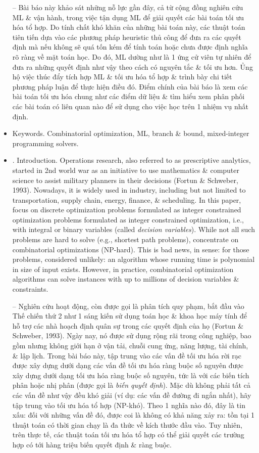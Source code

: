 \documentclass{article}
\begin{document}
\begin{itemize}
    -- Bài báo này khảo sát những nỗ lực gần đây, cả từ cộng đồng nghiên cứu ML \& vận hành, trong việc tận dụng ML để giải quyết các bài toán tối ưu hóa tổ hợp. Do tính chất khó khăn của những bài toán này, các thuật toán tiên tiến dựa vào các phương pháp heuristic thủ công để đưa ra các quyết định mà nếu không sẽ quá tốn kém để tính toán hoặc chưa được định nghĩa rõ ràng về mặt toán học. Do đó, ML dường như là 1 ứng cử viên tự nhiên để đưa ra những quyết định như vậy theo cách có nguyên tắc \& tối ưu hơn. Ủng hộ việc thúc đẩy tích hợp ML \& tối ưu hóa tổ hợp \& trình bày chi tiết phương pháp luận để thực hiện điều đó. Điểm chính của bài báo là xem các bài toán tối ưu hóa chung như các điểm dữ liệu \& tìm hiểu xem phân phối các bài toán có liên quan nào để sử dụng cho việc học trên 1 nhiệm vụ nhất định.
    \item {\sf Keywords.} Combinatorial optimization, ML, branch \& bound, mixed-integer programming solvers.
    \item {. Introduction.} Operations research, also referred to as prescriptive analytics, started in 2nd world war as an initiative to use mathematics \& computer science to assist military planners in their decisions (Fortun \& Schweber, 1993). Nowadays, it is widely used in industry, including but not limited to transportation, supply chain, energy, finance, \& scheduling. In this paper, focus on discrete optimization problems formulated as integer constrained optimization problems formulated as integer constrained optimization, i.e., with integral or binary variables (called {\it decision variables}). While not all such problems are hard to solve (e.g., shortest path problems), concentrate on combinatorial optimizations (NP-hard). This is bad news, in sense: for those problems, considered unlikely: an algorithm whose running time is polynomial in size of input exists. However, in practice, combinatorial optimization algorithms can solve instances with up to millions of decision variables \& constraints.

    -- Nghiên cứu hoạt động, còn được gọi là phân tích quy phạm, bắt đầu vào Thế chiến thứ 2 như 1 sáng kiến sử dụng toán học \& khoa học máy tính để hỗ trợ các nhà hoạch định quân sự trong các quyết định của họ (Fortun \& Schweber, 1993). Ngày nay, nó được sử dụng rộng rãi trong công nghiệp, bao gồm nhưng không giới hạn ở vận tải, chuỗi cung ứng, năng lượng, tài chính, \& lập lịch. Trong bài báo này, tập trung vào các vấn đề tối ưu hóa rời rạc được xây dựng dưới dạng các vấn đề tối ưu hóa ràng buộc số nguyên được xây dựng dưới dạng tối ưu hóa ràng buộc số nguyên, tức là với các biến tích phân hoặc nhị phân (được gọi là {\it biến quyết định}). Mặc dù không phải tất cả các vấn đề như vậy đều khó giải (ví dụ: các vấn đề đường đi ngắn nhất), hãy tập trung vào tối ưu hóa tổ hợp (NP-khó). Theo 1 nghĩa nào đó, đây là tin xấu: đối với những vấn đề đó, được coi là không có khả năng xảy ra: tồn tại 1 thuật toán có thời gian chạy là đa thức về kích thước đầu vào. Tuy nhiên, trên thực tế, các thuật toán tối ưu hóa tổ hợp có thể giải quyết các trường hợp có tới hàng triệu biến quyết định \& ràng buộc.


\end{itemize}
\end{document}
